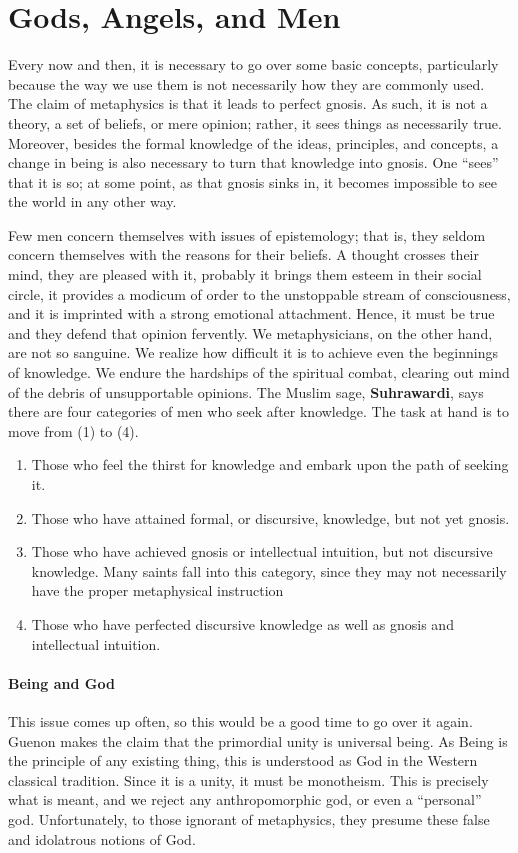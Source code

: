 \section{Gods, Angels, and Men}

Every now and then, it is necessary to go over some basic concepts, particularly because the way we use them is not necessarily how they are commonly used. The claim of metaphysics is that it leads to perfect gnosis. As such, it is not a theory, a set of beliefs, or mere opinion; rather, it sees things as necessarily true. Moreover, besides the formal knowledge of the ideas, principles, and concepts, a change in being is also necessary to turn that knowledge into gnosis. One “sees” that it is so; at some point, as that gnosis sinks in, it becomes impossible to see the world in any other way.

Few men concern themselves with issues of epistemology; that is, they seldom concern themselves with the reasons for their beliefs. A thought crosses their mind, they are pleased with it, probably it brings them esteem in their social circle, it provides a modicum of order to the unstoppable stream of consciousness, and it is imprinted with a strong emotional attachment. Hence, it must be true and they defend that opinion fervently. We metaphysicians, on the other hand, are not so sanguine. We realize how difficult it is to achieve even the beginnings of knowledge. We endure the hardships of the spiritual combat, clearing out mind of the debris of unsupportable opinions. The Muslim sage, \textbf{Suhrawardi}, says there are four categories of men who seek after knowledge. The task at hand is to move from (1) to (4).

\begin{enumerate}
\item Those who feel the thirst for knowledge and embark upon the path of seeking it. 
\item Those who have attained formal, or discursive, knowledge, but not yet gnosis. 
\item Those who have achieved gnosis or intellectual intuition, but not discursive knowledge. Many saints fall into this category, since they may not necessarily have the proper metaphysical instruction 
\item Those who have perfected discursive knowledge as well as gnosis and intellectual intuition. 
\end{enumerate}
\paragraph{Being and God}
This issue comes up often, so this would be a good time to go over it again. Guenon makes the claim that the primordial unity is universal being. As Being is the principle of any existing thing, this is understood as God in the Western classical tradition. Since it is a unity, it must be monotheism. This is precisely what is meant, and we reject any anthropomorphic god, or even a “personal” god. Unfortunately, to those ignorant of metaphysics, they presume these false and idolatrous notions of God.

